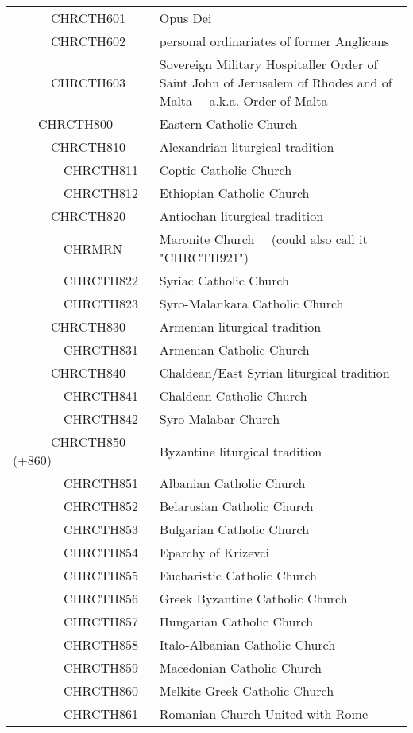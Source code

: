 \documentclass[12pt]{article}
\begin{document}
\begin{tiny}
\begin{center}
\begin{longtable}{|l|l|}
~~~~~~CHRCTH601 & Opus Dei \\
~~~~~~CHRCTH602 & personal ordinariates of former Anglicans \\
~~~~~~CHRCTH603 & Sovereign Military Hospitaller Order of Saint John of Jerusalem of Rhodes and of Malta	~~a.k.a. Order of Malta \\
~~~~CHRCTH800 & Eastern Catholic Church \\
~~~~~~CHRCTH810 & Alexandrian liturgical tradition \\
~~~~~~~~CHRCTH811 & Coptic Catholic Church \\
~~~~~~~~CHRCTH812 & Ethiopian Catholic Church \\
~~~~~~CHRCTH820 & Antiochan liturgical tradition \\
~~~~~~~~CHRMRN & Maronite Church	~~(could also call it "CHRCTH921") \\
~~~~~~~~CHRCTH822 & Syriac Catholic Church \\
~~~~~~~~CHRCTH823 & Syro-Malankara Catholic Church \\
~~~~~~CHRCTH830 & Armenian liturgical tradition \\
~~~~~~~~CHRCTH831 & Armenian Catholic Church \\
~~~~~~CHRCTH840 & Chaldean/East Syrian liturgical tradition \\
~~~~~~~~CHRCTH841 & Chaldean Catholic Church \\
~~~~~~~~CHRCTH842 & Syro-Malabar Church \\
~~~~~~CHRCTH850 (+860) & Byzantine liturgical tradition \\
~~~~~~~~CHRCTH851 & Albanian Catholic Church \\
~~~~~~~~CHRCTH852 & Belarusian Catholic Church \\
~~~~~~~~CHRCTH853 & Bulgarian Catholic Church \\
~~~~~~~~CHRCTH854 & Eparchy of Krizevci \\
~~~~~~~~CHRCTH855 & Eucharistic Catholic Church \\
~~~~~~~~CHRCTH856 & Greek Byzantine Catholic Church \\
~~~~~~~~CHRCTH857 & Hungarian Catholic Church \\
~~~~~~~~CHRCTH858 & Italo-Albanian Catholic Church \\
~~~~~~~~CHRCTH859 & Macedonian Catholic Church \\
~~~~~~~~CHRCTH860 & Melkite Greek Catholic Church \\
~~~~~~~~CHRCTH861 & Romanian Church United with Rome \\

\end{longtable}
\end{center}
\end{tiny}
\end{document}
